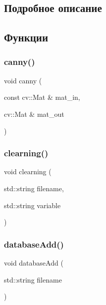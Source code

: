 \subsection{Подробное описание}


\subsection{Функции}
\mbox{\label{group__coreh_gaff2d42310702a0aab15af5ad62a59f2b}} 
\subsubsection{\texorpdfstring{canny()}{canny()}}
{\footnotesize\ttfamily void canny (\begin{DoxyParamCaption}\item[{const cv\+::\+Mat \&}]{mat\+\_\+in,  }\item[{cv\+::\+Mat \&}]{mat\+\_\+out }\end{DoxyParamCaption})}

\mbox{\label{group__coreh_gaebd676a1476aa4d75b280db8ae09d11c}} 
\subsubsection{\texorpdfstring{clearning()}{clearning()}}
{\footnotesize\ttfamily void clearning (\begin{DoxyParamCaption}\item[{std\+::string}]{filename,  }\item[{std\+::string}]{variable }\end{DoxyParamCaption})}

\mbox{\label{group__coreh_ga5a4a30ca6128e13ce1ec6efaa23dd6c7}} 
\subsubsection{\texorpdfstring{database\+Add()}{databaseAdd()}}
{\footnotesize\ttfamily void database\+Add (\begin{DoxyParamCaption}\item[{std\+::string}]{filename }\end{DoxyParamCaption})}

